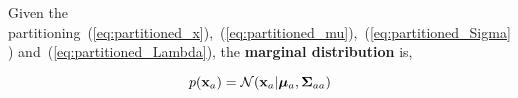 
\begin{framed}

 Given the partitioning~(\ref{eq:partitioned_x}),~(\ref{eq:partitioned_mu}),~(\ref{eq:partitioned_Sigma}) and~(\ref{eq:partitioned_Lambda}), the \textbf{marginal distribution} is, 

 \begin{equation}
 p(\mathbf{x}_a) = \mathcal{N}(\mathbf{x}_a|\bm{\mu}_a, \bm{\Sigma}_{aa})
 \end{equation} 
 
\end{framed}





